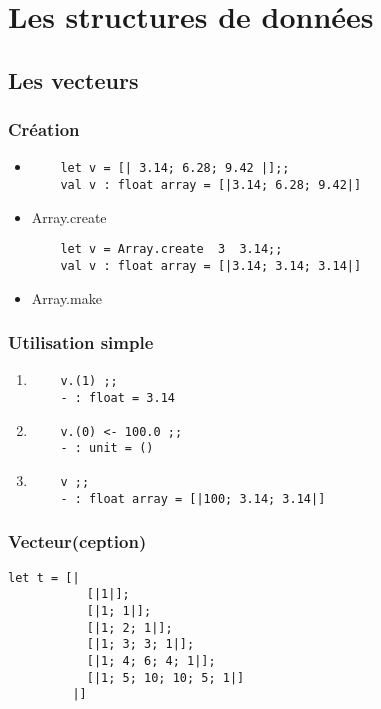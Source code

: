 \section{Les structures de données}
\subsection{Les vecteurs}
\begin{frame}[fragile]
\frametitle{Création}
	\begin{itemize}
	\item
	\begin{lstlisting}
	let v = [| 3.14; 6.28; 9.42 |];;
	val v : float array = [|3.14; 6.28; 9.42|]
	\end{lstlisting}

	\item Array.create
	\begin{lstlisting}
	let v = Array.create  3  3.14;;
	val v : float array = [|3.14; 3.14; 3.14|]
	\end{lstlisting}

	\item Array.make
	\end{itemize}
\end{frame}


\begin{frame}[fragile]
\frametitle{Utilisation simple}
	\begin{enumerate}
	\item
	\begin{lstlisting}
	v.(1) ;;
	- : float = 3.14
	\end{lstlisting}

	\item
	\begin{lstlisting}
	v.(0) <- 100.0 ;;
	- : unit = ()
	\end{lstlisting}

	\item
	\begin{lstlisting}
	v ;;
	- : float array = [|100; 3.14; 3.14|]
	\end{lstlisting}
	\end{enumerate}
\end{frame}

\begin{frame}[fragile]
\frametitle{Vecteur(ception)}
\begin{lstlisting}
let t = [| 
           [|1|];
           [|1; 1|];
           [|1; 2; 1|];
           [|1; 3; 3; 1|];
           [|1; 4; 6; 4; 1|];
           [|1; 5; 10; 10; 5; 1|]
         |] 
	\end{lstlisting}
\end{frame}

